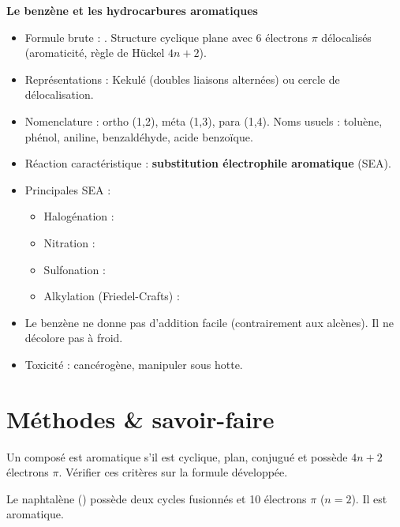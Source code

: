 \begin{synthese}
\textbf{Le benzène et les hydrocarbures aromatiques}
\begin{itemize}
    \item Formule brute : . Structure cyclique plane avec 6 électrons $\pi$ délocalisés (aromaticité, règle de Hückel $4n+2$).
    \item Représentations : Kekulé (doubles liaisons alternées) ou cercle de délocalisation.
    \item Nomenclature : ortho (1,2), méta (1,3), para (1,4). Noms usuels : toluène, phénol, aniline, benzaldéhyde, acide benzoïque.
    \item Réaction caractéristique : \textbf{substitution électrophile aromatique} (SEA).
    \item Principales SEA :
    \begin{itemize}
        \item Halogénation : 
        \item Nitration : 
        \item Sulfonation : 
        \item Alkylation (Friedel-Crafts) : 
    \end{itemize}
    \item Le benzène ne donne pas d'addition facile (contrairement aux alcènes). Il ne décolore pas  à froid.
    \item Toxicité : cancérogène, manipuler sous hotte.
\end{itemize}
\end{synthese}

\section{Méthodes \& savoir-faire}

Un composé est aromatique s'il est cyclique, plan, conjugué et possède $4n+2$ électrons $\pi$. Vérifier ces critères sur la formule développée.

\begin{exemple}
Le naphtalène () possède deux cycles fusionnés et 10 électrons $\pi$ ($n=2$). Il est aromatique.
\end{exemple}

